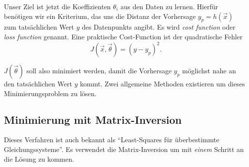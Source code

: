 Unser Ziel ist jetzt die Koeffizienten $\theta_i$ aus den Daten zu lernen. Hierfür
benötigen wir ein Kriterium, das uns die Distanz der Vorhersage $y_p = h(\vec x)$ zum tatsächlichen
Wert $y$ des Datenpunkts angibt. Es wird \emph{cost function} oder
\emph{loss function} genannt. Eine praktische Cost-Function ist der quadratische Fehler
\begin{equation}
J(\vec x, \vec \theta) = (y - y_p)^2.
\label{ml:regression:cost:sqerr}
\end{equation}

$J(\vec \theta)$ soll also minimiert werden, damit die Vorhersage $y_p$ möglichst nahe an den
tatsächlichen Wert $y$ kommt. Zwei allgemeine Methoden existieren um dieses
Minimierungsproblem zu lösen.

\subsection{Minimierung mit Matrix-Inversion}

Dieses Verfahren ist auch bekannt als ``Least-Squares für überbestimmte
Gleichungssysteme''. Es verwendet die Matrix-Inversion um mit \emph{einem} Schritt an die
Lösung zu kommen.

